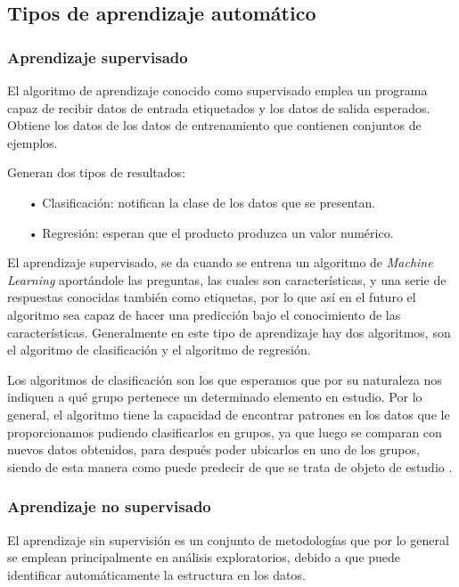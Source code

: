 \subsection{Tipos de aprendizaje automático}

\subsubsection{Aprendizaje supervisado}

El algoritmo de aprendizaje conocido como supervisado emplea un programa capaz de recibir datos de entrada etiquetados y los datos de salida esperados. Obtiene los datos de los datos de entrenamiento que contienen conjuntos de ejemplos.

Generan dos tipos de resultados:
\begin{itemize}
\item[•] Clasificación: notifican la clase de los datos que se presentan.
\item[•] Regresión: esperan que el producto produzca un valor numérico.
\end{itemize}

El aprendizaje supervisado, se da cuando se entrena un algoritmo de \textit{Machine Learning} aportándole las preguntas, las cuales son características, y una serie de respuestas conocidas también como etiquetas, por lo que así en el futuro el algoritmo sea capaz de hacer una predicción bajo el conocimiento de las características. Generalmente en este tipo de aprendizaje hay dos algoritmos, son el algoritmo de clasificación y el algoritmo de regresión.

Los algoritmos de clasificación son los que esperamos que por su naturaleza nos indiquen a qué grupo pertenece un determinado elemento en estudio. Por lo general, el algoritmo tiene la capacidad de encontrar patrones en los datos que le proporcionamos pudiendo clasificarlos en grupos, ya que luego se comparan con nuevos datos obtenidos, para después poder ubicarlos en uno de los grupos, siendo de esta manera como puede predecir de que se trata de objeto de estudio \cite{gonzalez2015}. 
 
\subsubsection{Aprendizaje no supervisado}

El aprendizaje sin supervisión es un conjunto de metodologías que por lo general se emplean principalmente en análisis exploratorios, debido a que puede identificar automáticamente la estructura en los datos.

